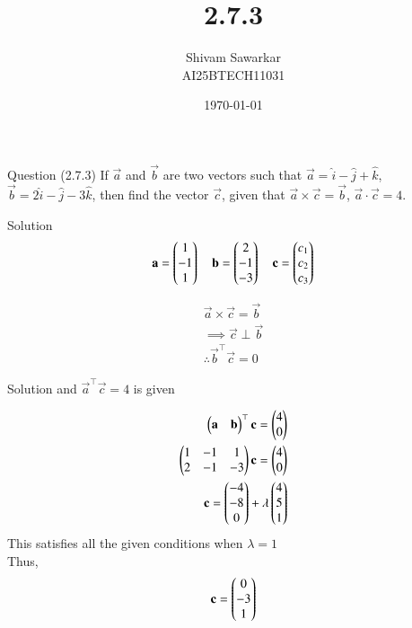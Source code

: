 \documentclass{beamer}
\title %
{2.7.3}
\date{\today}
\author %
{Shivam Sawarkar \\ AI25BTECH11031}
\begin{document}
\frame{\titlepage}
\begin{frame}{Question (2.7.3)}
If $\vec{a}$ and $\vec{b}$ are two vectors such that $\vec{a} = \hat{i} - \hat{j} + \hat{k}$, $\vec{b} = 2\hat{i} - \hat{j} - 3\hat{k}$, then find the vector $\vec{c}$, given that $\vec{a} \times \vec{c} = \vec{b}$, $\vec{a} \cdot \vec{c} = 4$.
\end{frame}

\begin{frame}{Solution}
\begin{align}
\mathbf{a} = \begin{pmatrix}1 \\ -1 \\ 1\end{pmatrix} \quad 
\mathbf{b} = \begin{pmatrix}2 \\ -1 \\ -3\end{pmatrix} \quad 
\mathbf{c} = \begin{pmatrix}c_1 \\ c_2 \\ c_3\end{pmatrix}
\end{align}

\begin{align}
\vec{a}\times\vec{c} = \vec{b} \\ 
\implies \vec{c} \perp \vec{b} \\ 
\therefore \vec{b}^\top\vec{c}=0
\end{align}
\end{frame}

\begin{frame}{Solution}
    and $\vec{a}^\top\vec{c}=4$ is given

\begin{align}
    \begin{pmatrix}\mathbf{a} & \mathbf{b}\end{pmatrix}^\top\mathbf{c}=\begin{pmatrix}4 \\ 0\end{pmatrix} \\ 
    \begin{pmatrix}1 & -1 & 1 \\ 
           2 & -1 & -3\end{pmatrix}\mathbf{c}=\begin{pmatrix}4 \\ 0\end{pmatrix} \\ 
    \mathbf{c}=\begin{pmatrix}-4 \\ -8 \\ 0\end{pmatrix}+\lambda\begin{pmatrix}4 \\ 5 \\ 1\end{pmatrix}
\end{align}
This satisfies all the given conditions when $\lambda=1$ \\ Thus,
\begin{align}
    \mathbf{c}=\begin{pmatrix}0 \\ -3 \\ 1\end{pmatrix}
\end{align}
\end{frame}
\end{document}
